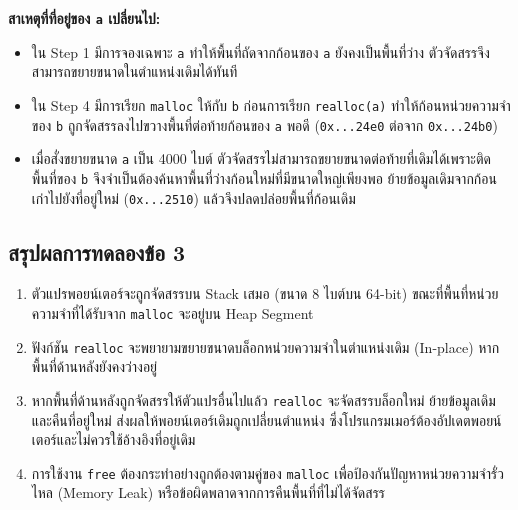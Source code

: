 \documentclass[a4paper,11pt]{article}
\newcommand{\code}[1]{\texttt{#1}}
\begin{document}
\textbf{สาเหตุที่ที่อยู่ของ \code{a} เปลี่ยนไป:}
\begin{itemize}[leftmargin=*]
  \item ใน Step 1 มีการจองเฉพาะ \code{a} ทำให้พื้นที่ถัดจากก้อนของ \code{a} ยังคงเป็นพื้นที่ว่าง ตัวจัดสรรจึงสามารถขยายขนาดในตำแหน่งเดิมได้ทันที
  \item ใน Step 4 มีการเรียก \code{malloc} ให้กับ \code{b} ก่อนการเรียก \code{realloc(a)} ทำให้ก้อนหน่วยความจำของ \code{b} ถูกจัดสรรลงไปขวางพื้นที่ต่อท้ายก้อนของ \code{a} พอดี (\code{0x...24e0} ต่อจาก \code{0x...24b0})
  \item เมื่อสั่งขยายขนาด \code{a} เป็น 4000 ไบต์ ตัวจัดสรรไม่สามารถขยายขนาดต่อท้ายที่เดิมได้เพราะติดพื้นที่ของ \code{b} จึงจำเป็นต้องค้นหาพื้นที่ว่างก้อนใหม่ที่มีขนาดใหญ่เพียงพอ ย้ายข้อมูลเดิมจากก้อนเก่าไปยังที่อยู่ใหม่ (\code{0x...2510}) แล้วจึงปลดปล่อยพื้นที่ก้อนเดิม
\end{itemize}

\subsection{สรุปผลการทดลองข้อ 3}

\begin{enumerate}[leftmargin=*]
  \item ตัวแปรพอยน์เตอร์จะถูกจัดสรรบน Stack เสมอ (ขนาด 8 ไบต์บน 64-bit) ขณะที่พื้นที่หน่วยความจำที่ได้รับจาก \code{malloc} จะอยู่บน Heap Segment
  \item ฟังก์ชัน \code{realloc} จะพยายามขยายขนาดบล็อกหน่วยความจำในตำแหน่งเดิม (In-place) หากพื้นที่ด้านหลังยังคงว่างอยู่
  \item หากพื้นที่ด้านหลังถูกจัดสรรให้ตัวแปรอื่นไปแล้ว \code{realloc} จะจัดสรรบล็อกใหม่ ย้ายข้อมูลเดิม และคืนที่อยู่ใหม่ ส่งผลให้พอยน์เตอร์เดิมถูกเปลี่ยนตำแหน่ง ซึ่งโปรแกรมเมอร์ต้องอัปเดตพอยน์เตอร์และไม่ควรใช้อ้างอิงที่อยู่เดิม
  \item การใช้งาน \code{free} ต้องกระทำอย่างถูกต้องตามคู่ของ \code{malloc} เพื่อป้องกันปัญหาหน่วยความจำรั่วไหล (Memory Leak) หรือข้อผิดพลาดจากการคืนพื้นที่ที่ไม่ได้จัดสรร
\end{enumerate}
\end{document}
